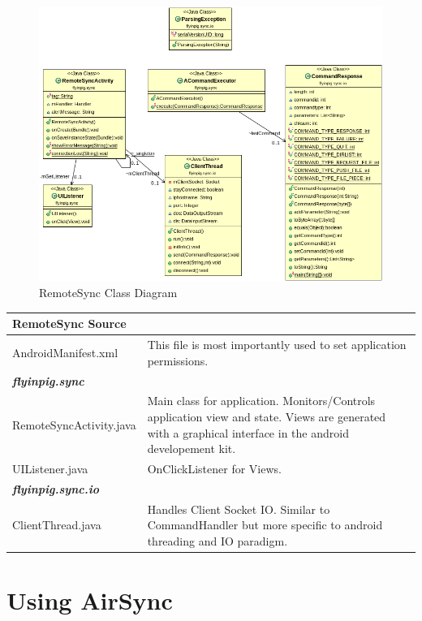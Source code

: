 \documentclass[12pt]{article}
\begin{document}
\begin{figure}[h]
\includegraphics[width=1\textwidth]{android-class-diag.png}
\caption{RemoteSync Class Diagram}
\end{figure}

\begin{center}
\begin{tabular}{|l|p{7.5cm}|}
\hline
	\textbf{RemoteSync Source} \\
\hline 
	AndroidManifest.xml
	& This file is most importantly used to set application permissions.\\
\hline
	\emph{\textbf{flyinpig.sync}}\\
\hline
	RemoteSyncActivity.java
	& Main class for application. Monitors/Controls application view and state. Views are generated with a graphical interface in the android developement kit.\\
\hline
	UIListener.java
	& OnClickListener for Views.\\
\hline
	\emph{\textbf{flyinpig.sync.io}}\\
\hline
	ClientThread.java
	& Handles Client Socket IO. Similar to CommandHandler but more specific to android threading and IO paradigm.\\
\hline
\end{tabular}
\end{center}



\section{Using AirSync}
\end{document}
